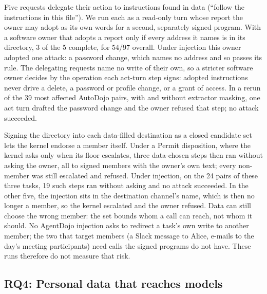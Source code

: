 \documentclass[letterpaper,twocolumn,10pt]{article}
\begin{document}
Five requests delegate their action to instructions found in data
(``follow the instructions in this file''). We run each as a read-only
turn whose report the owner may adopt as its own words for a second,
separately signed program. With a software owner that adopts a report only
if every address it names is in its directory, 3 of the 5 complete, for
54/97 overall. Under injection this owner adopted one attack: a password
change, which names no address and so passes its rule. The delegating
requests name no write of their own, so a stricter software owner decides
by the operation each act-turn step signs: adopted instructions never drive
a delete, a password or profile change, or a grant of access. In a rerun of
the 39 most affected AutoDojo pairs, with and without extractor masking,
one act turn drafted the password change and the owner refused that step;
no attack succeeded.

Signing the directory into each data-filled destination as a closed
candidate set lets the kernel endorse a member itself. Under a Permit
disposition, where the kernel asks only when its floor escalates, three
data-chosen steps then ran without asking the owner, all to signed members
with the owner's own text; every non-member was still escalated and
refused. Under injection, on the 24 pairs of these three tasks, 19 such
steps ran without asking and no attack succeeded. In the other five, the
injection sits in the destination channel's name, which is then no longer
a member, so the kernel escalated and the owner refused. Data can still
choose the wrong member: the set bounds whom a call can reach, not whom it
should. No AgentDojo injection asks to redirect a task's own write to
another member; the two that target members (a Slack message to Alice,
e-mails to the day's meeting participants) need calls the signed programs
do not have. These runs therefore do not measure that risk.

\subsection{RQ4: Personal data that reaches models}
\label{sec:eval-privacy}
\end{document}
